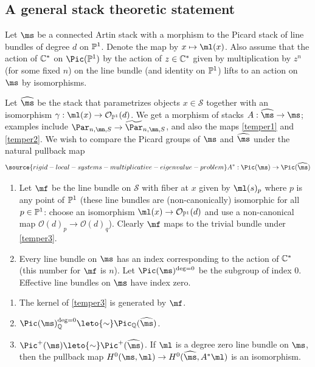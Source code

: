\subsection{A general stack theoretic statement}
Let ${\ms}$ be a connected Artin stack with a morphism to the Picard stack of line bundles of degree $d$ on  $\Bbb{P}^1$. Denote the map by $x\mapsto \ml(x)$. Also assume that the action of $\Bbb{C}^*$ on $\Pic(\Bbb{P}^1)$ by the action of $z\in \Bbb{C}^*$ given by multiplication by $z^n$ (for some fixed $n$) on the line bundle (and identity on $\Bbb{P}^1$) lifts to an action on ${\ms}$ by isomorphisms.

Let $\widehat{\ms}$ be the stack that parametrizes objects $x\in {\mathcal{S}}$ together with an isomorphism $\gamma:\ml(x)\to\mathcal{O}_{\Bbb{P}^1}(d)$.
We get a morphism of stacks $A:\widehat{\ms}\to{\ms}$; examples include    ${\Par}_{n,\mn,S}\to  \widetilde{\Par}_{n,\mn,S}$, and also the maps \eqref{temper1} and \eqref{temper2}.
We wish to compare the Picard groups of $\ms$ and $\widehat{\ms}$ under the natural  pullback map
\begin{equation}\label{temper3}
\source{rigid-local-systems-multiplicative-eigenvalue-problem}
A^*:\Pic({\ms})\to \Pic(\widehat{\ms})
\end{equation}
\begin{enumerate}
\item Let $\mf$ be the line bundle on ${\mathcal{S}}$ with fiber at $x$ given by $\ml(s)_p$ where $p$ is any point of $\Bbb{P}^1$ (these line bundles are (non-canonically) isomorphic for all $p\in\Bbb{P}^1$: choose an isomorphism $\ml(x)\to \mathcal{O}_{\Bbb{P}^1}(d)$ and use a non-canonical map $\mathcal{O}(d)_p\to \mathcal{O}(d)_q$). Clearly $\mf$ maps to the trivial bundle under \eqref{temper3}.
\item Every line bundle on ${\ms}$ has an index corresponding to the action of $\Bbb{C}^*$ (this number for $\mf$ is $n$). Let $\Pic({\ms})^{\deg=0}$ be the subgroup of index $0$. Effective line bundles on ${\ms}$ have index zero.
\end{enumerate}
\begin{lemma}
\notready\label{mass2}

\begin{enumerate}
\item[(i)]The kernel of \eqref{temper3} is generated by $\mf$.
\item[(ii)] $\Pic({\ms})^{\deg=0}_{\Bbb{Q}}\leto{\sim} \Pic_{\Bbb{Q}}(\widehat{\ms})$.
\item[(iii)] $\Pic^+({\ms})\leto{\sim} \Pic^+(\widehat{\ms})$. If $\ml$ is a degree zero  line bundle on ${\ms}$, then the pullback map
$H^0({\ms},\ml)\to H^0(\widehat{\ms},A^*\ml)$ is an isomorphism.
\end{enumerate}
\end{lemma}
